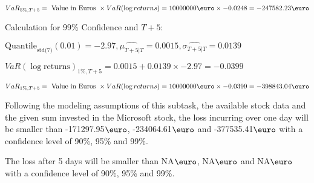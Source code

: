 \indent\indent $VaR_{5\%, T + 5} = \text{ Value in Euros } \times VaR(\log returns) = 10 000 000 \text{\euro} \times-0.0248 = -247582.23 \text{\euro}$\newline




Calculation for 99\% Confidence and $T+5$:

\indent\indent $\text{Quantile}_\text{std(7)}(0.01) = -2.97,\hat{\mu_{T+5|T}} = 0.0015, \hat{\sigma_{T+5|T}} = 0.0139$

\indent\indent $VaR(\log \text{returns})_{1\%, T + 5} = 0.0015 + 0.0139\times-2.97 = -0.0399$

\indent\indent $VaR_{1\%, T + 5} = \text{ Value in Euros } \times VaR(\log returns) = 10 000 000 \text{\euro} \times-0.0399 = -398843.04 \text{\euro}$\newline


Following the modeling assumptions of this subtask, the available stock data and the given sum invested in the Microsoft stock, the loss incurring over one day will be smaller than -171297.95$\text{\euro}$, -234064.61$\text{\euro}$  and -377535.41$\text{\euro}$  with a confidence level of 90\%, 95\%  and 99\%.

The loss after 5 days will be smaller than NA$\text{\euro}$, NA$\text{\euro}$  and NA$\text{\euro}$  with a confidence level of 90\%, 95\%  and 99\%.

